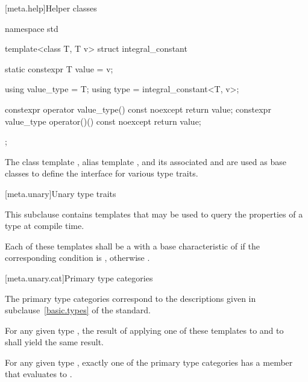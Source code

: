 [meta.help]{Helper classes}

%
\begin{codeblock}
namespace std {
  template<class T, T v> struct integral_constant {
    static constexpr T value = v;

    using value_type = T;
    using type = integral_constant<T, v>;

    constexpr operator value_type() const noexcept { return value; }
    constexpr value_type operator()() const noexcept { return value; }
  };
}
\end{codeblock}

%
%
%
%
\pnum
The class template ,
alias template , and
its associated 
 and 
are used as base classes to define
the interface for various type traits.

[meta.unary]{Unary type traits}

\pnum
This subclause contains templates that may be used to query the
properties of a type at compile time.

\pnum
Each of these templates shall be a
with a base characteristic of
 if the corresponding condition is , otherwise
.

[meta.unary.cat]{Primary type categories}

\pnum
The primary type categories correspond to the descriptions given in
subclause~\ref{basic.types} of the \Cpp{} standard.

\pnum
For any given type , the result of applying one of these templates to
 and to \cv{}~ shall yield the same result.

\pnum
\begin{note}
For any given type , exactly one of the primary type categories
has a  member that evaluates to .
\end{note}

